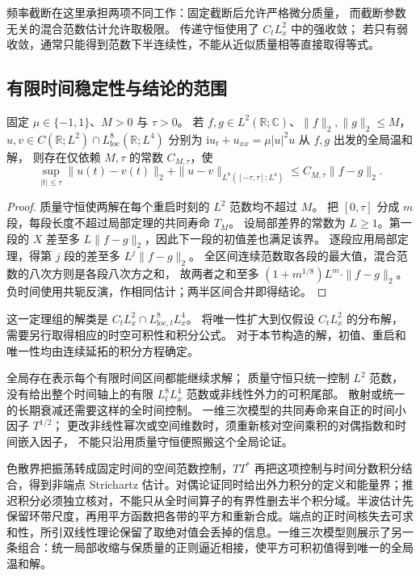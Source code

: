 频率截断在这里承担两项不同工作：固定截断后允许严格微分质量，
而截断参数无关的混合范数估计允许取极限。
传递守恒使用了 \(C_tL^2_x\) 中的强收敛；
若只有弱收敛，通常只能得到范数下半连续性，不能从近似质量相等直接取得等式。

\subsection{有限时间稳定性与结论的范围}
\label{b2:subsec:E-cubic-stability}

\begin{corollary}[有限时间上的连续依赖]\label{b2:cor:E-cubic-finite-time-stability}
固定 \(\mu\in\{-1,1\}\)、\(M>0\) 与 \(\tau>0\)。
若 \(f,g\in L^2(\mathbb R;\mathbb C)\)、\(\|f\|_2,\|g\|_2\le M\)，
\(u,v\in C(\mathbb R;L^2)\cap L^8_{\mathrm{loc}}(\mathbb R;L^4)\)
分别为 \(\mathrm i u_t+u_{xx}=\mu|u|^2u\) 从 \(f,g\) 出发的全局温和解，
则存在仅依赖 \(M,\tau\) 的常数 \(C_{M,\tau}\)，使
\[
 \sup_{|t|\le\tau}\|u(t)-v(t)\|_2
 +\|u-v\|_{L^8([ -\tau,\tau];L^4)}
 \le C_{M,\tau}\|f-g\|_2.
\]
\end{corollary}
\begin{proof}
质量守恒使两解在每个重启时刻的 \(L^2\) 范数均不超过 \(M\)。
把 \([0,\tau]\) 分成 \(m\) 段，每段长度不超过局部定理的共同寿命 \(T_M\)。
设局部差界的常数为 \(L\ge1\)。第一段的 \(X\) 差至多
\(L\|f-g\|_2\)，因此下一段的初值差也满足该界。
逐段应用局部定理，得第 \(j\) 段的差至多
\(L^j\|f-g\|_2\)。
全区间连续范数取各段的最大值，混合范数的八次方则是各段八次方之和，
故两者之和至多 \((1+m^{1/8})L^m\cdot\|f-g\|_2\)。
负时间使用共轭反演，作相同估计；两半区间合并即得结论。
\end{proof}

这一定理组的解类是 \(C_tL^2_x\cap L^8_{\mathrm{loc},t}L^4_x\)。
将唯一性扩大到仅假设 \(C_tL^2_x\) 的分布解，需要另行取得相应的时空可积性和积分公式。
对于本节构造的解，初值、重启和唯一性均由连续延拓的积分方程确定。

\ProseParagraphBreak
全局存在表示每个有限时间区间都能继续求解；
质量守恒只统一控制 \(L^2\) 范数，
没有给出整个时间轴上的有限 \(L^8_tL^4_x\) 范数或非线性外力的可积尾部。
散射或统一的长期衰减还需要这样的全时间控制。
一维三次模型的共同寿命来自正的时间小因子 \(T^{1/2}\)；
更改非线性幂次或空间维数时，须重新核对空间乘积的对偶指数和时间嵌入因子，
不能只沿用质量守恒便照搬这个全局论证。

\begin{chaptersummary}
色散界把振荡转成固定时间的空间范数控制，\(TT^*\) 再把这项控制与时间分数积分结合，得到非端点 Strichartz 估计。对偶论证同时给出外力积分的定义和能量界；推迟积分必须独立核对，不能只从全时间算子的有界性删去半个积分域。半波估计先保留环带尺度，再用平方函数把各带的平方和重新合成。端点的正时间核失去可求和性，所引双线性理论保留了取绝对值会丢掉的信息。一维三次模型则展示了另一条组合：统一局部收缩与保质量的正则逼近相接，使平方可积初值得到唯一的全局温和解。
\end{chaptersummary}

